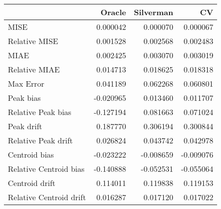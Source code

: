 \begin{tabular}{lrrr}
  \hline
 & Oracle & Silverman & CV \\ 
  \hline
MISE & 0.000042 & 0.000070 & 0.000067 \\ 
  Relative MISE & 0.001528 & 0.002568 & 0.002483 \\ 
  MIAE & 0.002425 & 0.003070 & 0.003019 \\ 
  Relative MIAE & 0.014713 & 0.018625 & 0.018318 \\ 
  Max Error & 0.041189 & 0.062268 & 0.060801 \\ 
  Peak bias & -0.020965 & 0.013460 & 0.011707 \\ 
  Relative Peak bias & -0.127194 & 0.081663 & 0.071024 \\ 
  Peak drift & 0.187770 & 0.306194 & 0.300844 \\ 
  Relative Peak drift & 0.026824 & 0.043742 & 0.042978 \\ 
  Centroid bias & -0.023222 & -0.008659 & -0.009076 \\ 
  Relative Centroid bias & -0.140888 & -0.052531 & -0.055064 \\ 
  Centroid drift & 0.114011 & 0.119838 & 0.119153 \\ 
  Relative Centroid drift & 0.016287 & 0.017120 & 0.017022 \\ 
   \hline
\end{tabular}
